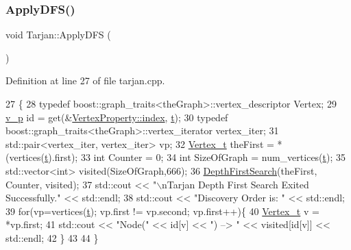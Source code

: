 \mbox{\label{class_tarjan_a674767d7e49ada6a738ab69187e4836d}} 
\subsubsection{\texorpdfstring{Apply\+D\+F\+S()}{ApplyDFS()}}
{\footnotesize\ttfamily void Tarjan\+::\+Apply\+D\+FS (\begin{DoxyParamCaption}{ }\end{DoxyParamCaption})}



Definition at line 27 of file tarjan.\+cpp.


\begin{DoxyCode}
27                       \{
28     \textcolor{keyword}{typedef} boost::graph\_traits<theGraph>::vertex\_descriptor Vertex;
29     \hyperlink{utilities_8h_a3f4959b3d837fa6351a9414c79280286}{v\_p} \textcolor{keywordtype}{id} = \textcolor{keyword}{get}(&\hyperlink{struct_utility_structs_1_1_vertex_property_a636cb729438e999aa3d9a17ac39d8641}{VertexProperty::index}, \hyperlink{class_tarjan_a54b0703f885a3514ea0bf4cdbc7fdaad}{t});
30     \textcolor{keyword}{typedef} boost::graph\_traits<theGraph>::vertex\_iterator vertex\_iter;
31     std::pair<vertex\_iter, vertex\_iter> vp;
32     \hyperlink{utilities_8h_a344cd987714d06997f0becda3c96d6e2}{Vertex\_t} theFirst = *(vertices(\hyperlink{class_tarjan_a54b0703f885a3514ea0bf4cdbc7fdaad}{t}).first);
33     \textcolor{keywordtype}{int} Counter = 0;
34     \textcolor{keywordtype}{int} SizeOfGraph = num\_vertices(\hyperlink{class_tarjan_a54b0703f885a3514ea0bf4cdbc7fdaad}{t});
35     std::vector<int> visited(SizeOfGraph,666);
36     \hyperlink{class_tarjan_a277c58dc6f712a6ae1ef2e59c9ad58e1}{DepthFirstSearch}(theFirst, Counter, visited);
37     std::cout << \textcolor{stringliteral}{"\(\backslash\)nTarjan Depth First Search Exited Successfully."} << std::endl;
38     std::cout << \textcolor{stringliteral}{"Discovery Order is: "} << std::endl;
39      \textcolor{keywordflow}{for}(vp=vertices(\hyperlink{class_tarjan_a54b0703f885a3514ea0bf4cdbc7fdaad}{t}); vp.first != vp.second; vp.first++)\{
40         \hyperlink{utilities_8h_a344cd987714d06997f0becda3c96d6e2}{Vertex\_t} v = *vp.first;
41         std::cout << \textcolor{stringliteral}{"Node("} << \textcolor{keywordtype}{id}[v] << \textcolor{stringliteral}{") --> "} << visited[\textcolor{keywordtype}{id}[v]] << std::endl;
42     \}
43 
44 \}
\end{DoxyCode}
\mbox{\label{class_tarjan_a58ad9fcfd599a608fa1671e4607db378}} 
